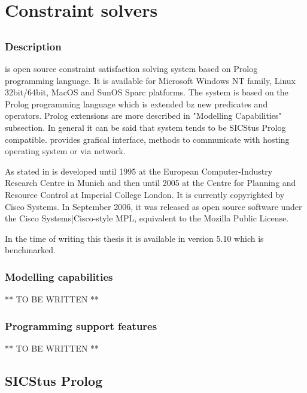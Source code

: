 \chapter{Constraint solvers}

\section{\eclipse}

\subsection{Description}

\eclipse is open source constraint satisfaction solving system based on Prolog 
programming language. It is available for Microsoft Windows NT family, 
Linux 32bit/64bit, MacOS and SunOS Sparc platforms. The system is based on the Prolog programming
language which is extended bz new predicates and operators. Prolog extensions are 
more described in "Modelling Capabilities" subsection. In general it can be said that \eclipse
system tends to be SICStus Prolog compatible. \eclipse provides grafical interface,
methods to communicate with hosting operating system or via network. 

As stated in \cite{wiki:Eclipse} \eclipse is developed until 1995 at the European 
Computer-Industry Research Centre in Munich and then until 2005 at the Centre for 
Planning and Resource Control at Imperial College London. It is currently copyrighted by 
Cisco Systems. In September 2006, it was released as open source software under 
the Cisco Systems|Cisco-style MPL, equivalent to the Mozilla Public License.

In the time of writing this thesis it is available in version 5.10 which is benchmarked.


\subsection{Modelling capabilities}

** TO BE WRITTEN **

\subsection{Programming support features}

** TO BE WRITTEN **


\section{SICStus Prolog}

